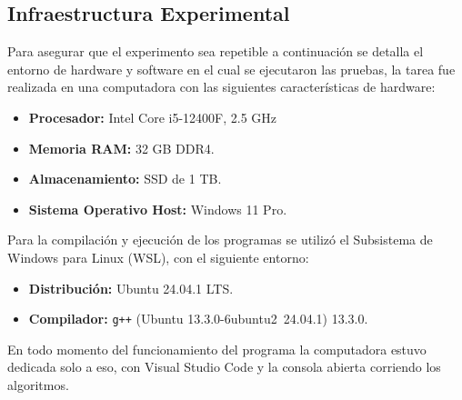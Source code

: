 \subsection{Infraestructura Experimental}

Para asegurar que el experimento sea repetible a continuación se detalla el entorno de hardware y software en el cual se ejecutaron las pruebas, la tarea fue realizada en una computadora con las siguientes características de hardware:

\begin{itemize}
    \item \textbf{Procesador:} Intel Core i5-12400F, 2.5 GHz
    \item \textbf{Memoria RAM:} 32 GB DDR4.
    \item \textbf{Almacenamiento:} SSD de 1 TB.
    \item \textbf{Sistema Operativo Host:} Windows 11 Pro.
\end{itemize}

Para la compilación y ejecución de los programas se utilizó el Subsistema de Windows para Linux (WSL), con el siguiente entorno:

\begin{itemize}
    \item \textbf{Distribución:} Ubuntu 24.04.1 LTS.
    \item \textbf{Compilador:} \texttt{g++} (Ubuntu 13.3.0-6ubuntu2~24.04.1) 13.3.0.
\end{itemize}

En todo momento del funcionamiento del programa la computadora estuvo dedicada solo a eso, con Visual Studio Code y la consola abierta corriendo los algoritmos.